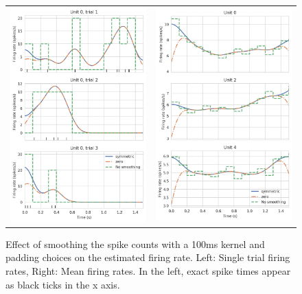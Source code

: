     \begin{figure}
        \centering
        \begin{tabular}{cc}
        \includegraphics[width=7cm]{figures/one_with_step.png}
        & \includegraphics[width=7cm]{figures/mean_with_step.png}
        \end{tabular}
        \caption[Effect of smoothing and padding choices on the estimated firing rate.]{Effect of smoothing the spike counts with a 100ms kernel and padding choices on the estimated firing rate. Left: Single trial firing rates, Right: Mean firing rates. In the left, exact spike times appear as black ticks in the x axis.}
        \label{fig:padding}
    \end{figure} 
    
